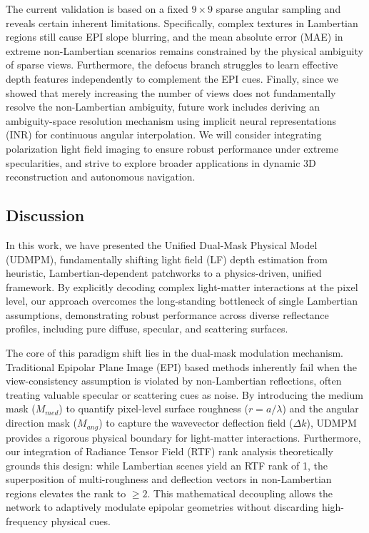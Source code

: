 \documentclass[journal]{IEEEtran}
\begin{document}
The current validation is based on a fixed $9 \times 9$ sparse angular sampling and reveals certain inherent limitations. Specifically, complex textures in Lambertian regions still cause EPI slope blurring, and the mean absolute error (MAE) in extreme non-Lambertian scenarios remains constrained by the physical ambiguity of sparse views. Furthermore, the defocus branch struggles to learn effective depth features independently to complement the EPI cues. Finally, since we showed that merely increasing the number of views does not fundamentally resolve the non-Lambertian ambiguity, future work includes deriving an ambiguity-space resolution mechanism using implicit neural representations (INR) for continuous angular interpolation. We will consider integrating polarization light field imaging to ensure robust performance under extreme specularities, and strive to explore broader applications in dynamic 3D reconstruction and autonomous navigation.


\subsection{Discussion}

In this work, we have presented the Unified Dual-Mask Physical Model (UDMPM), fundamentally shifting light field (LF) depth estimation from heuristic, Lambertian-dependent patchworks to a physics-driven, unified framework. By explicitly decoding complex light-matter interactions at the pixel level, our approach overcomes the long-standing bottleneck of single Lambertian assumptions, demonstrating robust performance across diverse reflectance profiles, including pure diffuse, specular, and scattering surfaces.

The core of this paradigm shift lies in the dual-mask modulation mechanism. Traditional Epipolar Plane Image (EPI) based methods inherently fail when the view-consistency assumption is violated by non-Lambertian reflections, often treating valuable specular or scattering cues as noise. By introducing the medium mask ($M_{med}$) to quantify pixel-level surface roughness ($r = a/\lambda$) and the angular direction mask ($M_{ang}$) to capture the wavevector deflection field ($\Delta k$), UDMPM provides a rigorous physical boundary for light-matter interactions. Furthermore, our integration of Radiance Tensor Field (RTF) rank analysis theoretically grounds this design: while Lambertian scenes yield an RTF rank of 1, the superposition of multi-roughness and deflection vectors in non-Lambertian regions elevates the rank to $\ge 2$. This mathematical decoupling allows the network to adaptively modulate epipolar geometries without discarding high-frequency physical cues.
\end{document}
